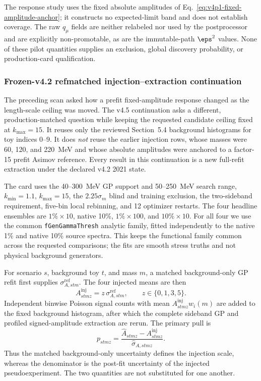 {The response study uses the fixed absolute amplitudes of
Eq.~\eqref{eq:v4p1-fixed-amplitude-anchor}; it constructs no expected-limit band and
does not establish coverage. The raw $q_\mu$ fields are neither relabeled nor used by
the postprocessor and are explicitly non-promotable, as are the immutable-path
$\eps^2$ values. None of these pilot quantities supplies an exclusion, global
discovery probability, or production-card qualification.

\subsubsection{Frozen-v4.2 refmatched injection--extraction continuation}
\label{sec:v4p5-exposure-refmatched-continuation}

The preceding scan asked how a prefit fixed-amplitude response changed as the
length-scale ceiling was moved.  The v4.5 continuation asks a different,
production-matched question while keeping the requested candidate ceiling fixed at
$k_{\max}=15$.  It reuses only the reviewed Section~5.4 background histograms for
toy indices 0--9.  It does \emph{not} reuse the earlier injection rows, whose masses
were 60, 120, and 220~MeV and whose absolute amplitudes were anchored to a
factor-15 prefit Asimov reference.  Every result in this continuation is a new
full-refit extraction under the declared v4.2 2021 state.

The card uses the 40--300~MeV GP support and 50--250~MeV search range,
$k_{\min}=1.1$, $k_{\max}=15$, the $2.25\sigma_m$ blind and training exclusion,
the two-sideband requirement, five-bin local rebinning, and 12 optimizer restarts.
The four headline ensembles are $1\%\times10$, native 10\%, $1\%\times100$,
and $10\%\times10$.  For all four we use the common
\texttt{fGenGammaThresh} analytic family, fitted independently to the native 1\%
and native 10\% source spectra.  This keeps the functional family common across
the requested comparisons; the fits are smooth stress truths and not physical
background generators.

For scenario $s$, background toy $t$, and mass $m$, a matched background-only GP
refit first supplies $\sigma^{\mathrm{ref}}_{A,stm}$.  The four injected means are
then
\begin{equation}
 A^{\mathrm{inj}}_{stmz}=z\,\sigma^{\mathrm{ref}}_{A,stm},
 \qquad z\in\{0,1,3,5\}.
 \label{eq:v4p5-refmatched-injection}
\end{equation}
Independent binwise Poisson signal counts with mean
$A^{\mathrm{inj}}_{stmz}w_i(m)$ are added to the fixed background histogram, after
which the complete sideband GP and profiled signed-amplitude extraction are rerun.
The primary pull is
\begin{equation}
 p_{stmz}=
 \frac{\widehat A_{stmz}-A^{\mathrm{inj}}_{stmz}}
      {\widehat\sigma_{A,stmz}}.
 \label{eq:v4p5-pull}
\end{equation}
Thus the matched background-only uncertainty defines the injection scale, whereas
the denominator is the post-fit uncertainty of the injected pseudoexperiment.  The
two quantities are not substituted for one another.

}

